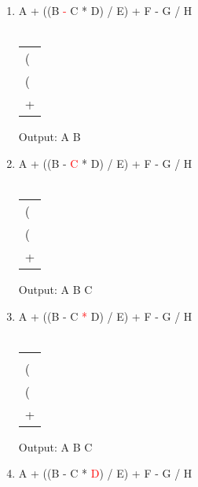 \documentclass[a4paper]{article}
\begin{document}
\begin{large}
\begin{enumerate}
          \newpage

    \item
          A + ((B \textcolor{red}{-}  C * D) / E) + F - G / H\\
          \\
          \begin{tabular}[t]{ | p{1em} | }
            \\ \hline
            \makecell{-} \\ \hline
            (            \\ \hline
            (            \\ \hline
            +            \\ \hline
          \end{tabular}
          \hspace{2em}
          Output: A B
    \item
          A + ((B - \textcolor{red}{C} * D) / E) + F - G / H\\
          \\
          \begin{tabular}[t]{ | p{1em} | }
            \\ \hline
            \makecell{-} \\ \hline
            (            \\ \hline
            (            \\ \hline
            +            \\ \hline
          \end{tabular}
          \hspace{2em}
          Output: A B C
    \item
          A + ((B - C \textcolor{red}{*} D) / E) + F - G / H\\
          \\
          \begin{tabular}[t]{ | p{1em} | }
            \makecell{*} \\ \hline
            \makecell{-} \\ \hline
            (            \\ \hline
            (            \\ \hline
            +            \\ \hline
          \end{tabular}
          \hspace{2em}
          Output: A B C
    \item
          A + ((B - C * \textcolor{red}{D}) / E) + F - G / H\\

\end{enumerate}
\end{large}
\end{document}
